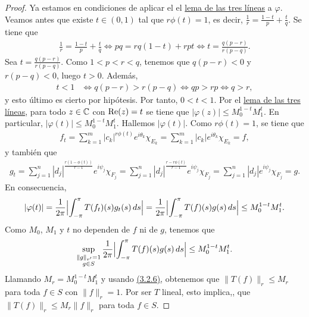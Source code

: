 \documentclass[a4paper, 12pt, oneside]{book}
\begin{document}
\begin{proof}
    Ya estamos en condiciones de aplicar el el \hyperref[3.2.3]{\color{blue}lema de las tres líneas} a $\varphi$. Veamos antes que existe $t \in (0,1)$ tal que $r\phi(t) = 1$, es decir, $\frac{1}{r} = \frac{1-t}{p}+\frac{t}{q}$. Se tiene que
    \begin{align*}
        \frac{1}{r} = \frac{1-t}{p}+\frac{t}{q} \iff pq = rq(1-t)+rpt \iff t = \frac{q(p-r)}{r(p-q)}.
    \end{align*}
    Sea $t = \frac{q(p-r)}{r(p-q)}$. Como $1 < p < r < q$, tenemos que $q(p-r) < 0$ y $r(p-q) < 0$, luego $t > 0$. Además,
    \[\begin{aligned}
        t < 1 &\iff q(p-r) > r(p-q) \iff qp > rp \iff q > r,
    \end{aligned}\]
    y esto último es cierto por hipótesis. Por tanto, $0 < t < 1$. Por el \hyperref[3.2.3]{\color{blue}lema de las tres líneas}, para todo $z\in\C$ con $\real(z)=t$ se tiene que $|\varphi(z)| \leq M_0^{1-t}M_1^t$. En particular, $|\varphi(t)| \leq M_0^{1-t}M_1^t$. Hallemos $|\varphi(t)|$. Como $r\phi(t) = 1$, se tiene que
    \begin{align*}
        f_t = \sum_{k=1}^m |c_k|^{r\phi(t)}e^{i\theta_k}\chi_{E_k} = \sum_{k=1}^m |c_k|e^{i\theta_k}\chi_{E_k} = f,
    \end{align*}
    y también que
    \begin{align*}
        g_t = \sum_{j=1}^n |d_j|^{\frac{r(1-\phi(t))}{r-1}}e^{i\psi_j}\chi_{F_j} =  \sum_{j=1}^n |d_j|^{\frac{r-r\phi(t)}{r-1}}e^{i\psi_j}\chi_{F_j}=  \sum_{j=1}^n |d_j|e^{i\psi_j}\chi_{F_j} = g.
    \end{align*}
    En consecuencia,
    \[|\varphi(t)| = \frac{1}{2\pi}\Bigl|\integral[s]{-\pi}{\pi}{T(f_t)(s)g_t(s)}\Bigr| =  \frac{1}{2\pi}\Bigl|\integral[s]{-\pi}{\pi}{T(f)(s)g(s)}\Bigr| \leq M_0^{1-t}M_1^t.\]
    Como $M_0$, $M_1$ y $t$ no dependen de $f$ ni de $g$, tenemos que
    \[\sup_{\substack{\|g\|_{r'}=1 \\ g \in S}}\frac{1}{2\pi}\Bigl|\integral[s]{-\pi}{\pi}{T(f)(s)g(s)}\Bigr| \leq M_0^{1-t}M_1^t.\]
    Llamando $M_r = M_0^{1-t}M_1^t$ y usando \hyperref[3.2.6]{\color{blue}(3.2.6)}, obtenemos que $\|T(f)\|_r \leq M_r$ para toda $f \in S$ con $\|f\|_r = 1$. Por ser $T$ lineal, esto implica,, que $\|T(f)\|_r \leq M_r\|f\|_r$ para toda $f \in S$.


\end{proof}
\end{document}
